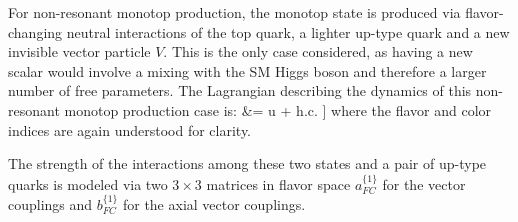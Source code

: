 For non-resonant monotop production, the monotop state is produced via
flavor-changing neutral interactions of the top quark, a lighter up-type
quark and a new invisible vector particle $V$. 
This is the only case considered, as having a new scalar 
would involve a mixing with the SM Higgs boson and therefore a larger number of free parameters. 
The Lagrangian describing the
dynamics of this non-resonant monotop production case is:
\be\label{eq:lagrangianNonResonantVector}\bsp
\lag &=
\bigg[
V_\mu \bar u \gmu \Big[a^1_{FC} \!+\! b^1_{FC} \gamma_5 \Big] u  
%
+ \rm h.c. 
\bigg] 
\esp\ee
where the flavor and color indices are
again understood for clarity.

The strength of the interactions among these two states and a pair
of up-type quarks is modeled via two $3\times 3$ matrices in flavor space $a^{\{1\}}_{FC}$ for the vector couplings
and $b^{\{1\}}_{FC}$ for the axial vector couplings.

